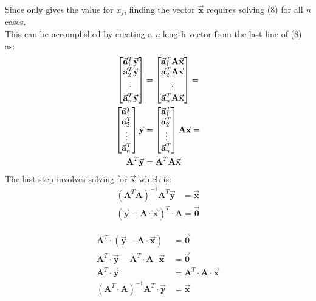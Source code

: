 \documentclass[a4paper,10pt]{article}
\newcommand{\cA}{\ensuremath{\mathbf{A}}}
\newcommand{\cx}{\ensuremath{\vec{\mathbf{x}}}}
\newcommand{\cy}{\ensuremath{\vec{\mathbf{y}}}}
\newcommand{\cZero}{\ensuremath{\vec{\mathbf{0}}}}
\newcommand{\cajt}[1]{\ensuremath{\vec{\mathbf{a}}^{T}_{#1}}}
\newcommand{\cxj}[1]{\ensuremath{x_{#1}}}
\begin{document}
Since only gives the value for $\cxj{j}$, finding the vector $\cx$ requires solving (8) for all \textit{n} cases.\\
\break
This can be accomplished by creating a \textit{n}-length vector from the last line of (8) as:
\begin{equation}
\begin{split}
\ensuremath{
\begin{bmatrix}
\cajt{1}\cy\\
\cajt{2}\cy\\
\vdots\\
\cajt{n}\cy\\
\end{bmatrix}&=
\begin{bmatrix}
\cajt{1}\cA\cx\\
\cajt{2}\cA\cx\\
\vdots\\
\cajt{n}\cA\cx\\
\end{bmatrix}=\\
\begin{bmatrix}
\cajt{1}\\
\cajt{2}\\
\vdots\\
\cajt{n}\\
\end{bmatrix}\cy&=
\begin{bmatrix}
\cajt{1}\\
\cajt{2}\\
\vdots\\
\cajt{n}\\
\end{bmatrix}\cA\cx=\\
\cA^{T}\cy&=
\cA^{T}\cA\cx\\
}
\end{split}
\end{equation}
The last step involves solving for $\cx$ which is:
\begin{equation}
\begin{split}
\left({\cA}^{T}\cA\right)^{-1}{\cA}^{T}\cy&=\cx
\end{split}
\end{equation}
\newpage
\begin{equation}
\begin{split}
\left(\cy - \cA\cdot\cx\right)^{T}\cdot{\cA} = \cZero
\end{split}
\end{equation}


\begin{equation}
\begin{split}
{\cA}^{T}\cdot\left(\cy - \cA\cdot\cx\right) &= \cZero\\
{\cA}^{T}\cdot\cy - {\cA}^{T}\cdot\cA\cdot\cx &= \cZero\\
{\cA}^{T}\cdot\cy &= {\cA}^{T}\cdot\cA\cdot\cx\\
\left({\cA}^{T}\cdot\cA\right)^{-1}{\cA}^{T}\cdot\cy &= \cx\\
\end{split}
\end{equation}
\end{document}
